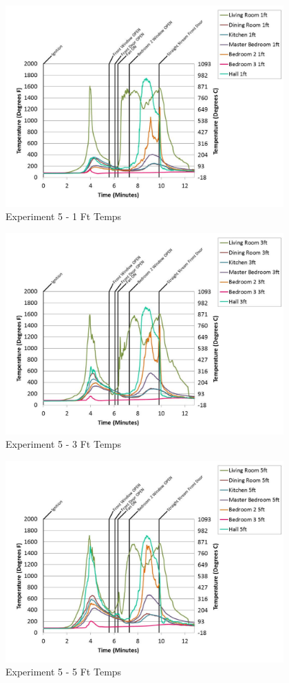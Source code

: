 \documentclass{article}
\begin{document}
\begin{appendices}
	\begin{figure}[h!]
		\centering
		\includegraphics[height=3.05in]{0_Images/Results_Charts/Exp_5_Charts/1FtTemps.pdf}
		\caption{Experiment 5 - 1 Ft Temps}
	\end{figure}
 

	\begin{figure}[h!]
		\centering
		\includegraphics[height=3.05in]{0_Images/Results_Charts/Exp_5_Charts/3FtTemps.pdf}
		\caption{Experiment 5 - 3 Ft Temps}
	\end{figure}
 
	\clearpage

	\begin{figure}[h!]
		\centering
		\includegraphics[height=3.05in]{0_Images/Results_Charts/Exp_5_Charts/5FtTemps.pdf}
		\caption{Experiment 5 - 5 Ft Temps}
	\end{figure}
 


\end{appendices}
\end{document}

